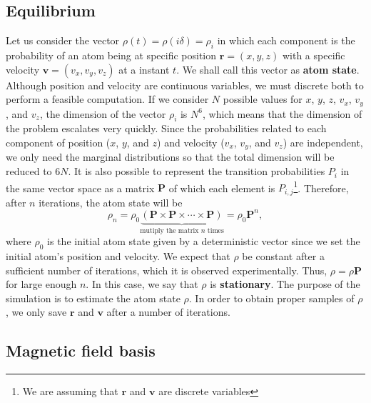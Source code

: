 \subsection{Equilibrium}
\label{sec:equilibrium}

Let us consider the vector $ \rho(t) = \rho(i\delta) = \rho_i $ in which each component is the probability of an atom being at specific position $ \mathbf{r} = (x, y, z) $ with a specific velocity $ \mathbf{v} = (v_x, v_y, v_z) $ at a instant $ t $.
We shall call this vector as \textbf{atom state}. Although position and velocity are continuous variables, we must discrete both to perform a feasible computation. If we consider $ N $ possible values for $ x $, $ y $, $ z $, $ v_x $, $ v_y $, and $ v_z $, the dimension of the vector $ \rho_i $ is $ N^6 $, which means that the dimension of the problem escalates very quickly. Since the probabilities related to each component of position ($ x $, $ y $, and $ z $) and velocity ($ v_x $, $ v_y $, and $ v_z $) are independent, we only need the marginal distributions so that the total dimension will be reduced to $ 6N $. It is also possible to represent the transition probabilities $ P_i $ in the same vector space as a matrix $ \mathbf{P} $ of which each element is $ P_{i,j} $\footnote{We are assuming that $ \mathbf{r} $ and $ \mathbf{v} $ are discrete variables}. Therefore, after $ n $ iterations, the atom state will be \cite[Section~23.2]{wasserman2004all}
\begin{equation}
    \rho_n =  \rho_0 \underbrace{(\mathbf{P} \times \mathbf{P} \times \cdots \times \mathbf{P})}_{\textrm{mutiply the matrix $n$ times}} = \rho_0 \mathbf{P}^n,
\end{equation}
where $ \rho_0 $ is the initial atom state given by a deterministic vector since we set the initial atom's position and velocity. We expect that $ \rho $ be constant after a sufficient number of iterations, which it is observed experimentally. Thus, $ \rho = \rho\mathbf{P} $ for large enough $ n $. In this case, we say that $ \rho $ is \textbf{stationary}. The purpose of the simulation is to estimate the atom state $ \rho $. In order to obtain proper samples of $ \rho $, we only save $ \mathbf{r} $ and $ \mathbf{v} $ after a number of iterations.

\subsection{Magnetic field basis}
\label{sec:magnetic-field-basis}

